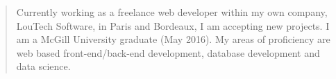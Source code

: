\begin{quote}
Currently working as a freelance web developer within my own company, LouTech Software, in Paris and Bordeaux, I am accepting new projects. I am a McGill University graduate (May 2016).
My areas of proficiency are web based front-end/back-end development, database development and data science.
\end{quote}





\divider\smallskip


\divider\smallskip


\divider\smallskip



\divider\smallskip







\begin{minipage}{0.20\textwidth}
\end{minipage}%
\begin{minipage}{0.22\textwidth}
\end{minipage}%
\begin{minipage}{0.15\textwidth}
\end{minipage}%









